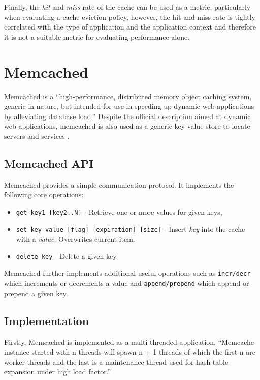 Finally, the \textit{hit} and \textit{miss} rate of the cache can be used as a metric, particularly when evaluating a cache eviction policy, however, the hit and miss rate is tightly correlated with the type of application and the application context and therefore it is not a suitable metric for evaluating performance alone.


\section{Memcached}

Memcached is a ``high-performance, distributed memory object caching system, generic in nature, but intended for use in speeding up dynamic web applications by alleviating database load.'' \cite{interactive2006memcached} Despite the official description aimed at dynamic web applications, memcached is also used as a generic key value store to locate servers and services \cite{atikoglu2012workload}.

\subsection{Memcached API}
Memcached provides a simple communication protocol. It implements the following core operations:

\begin{itemize}
    \item \texttt{get key1 [key2..N]} - Retrieve one or more values for given keys,
    \item \texttt{set key value [flag] [expiration] [size]} - Insert \textit{key} into the cache with a \textit{value}. Overwrites current item.
    \item \texttt{delete key} - Delete a given key.
\end{itemize}

Memcached further implements additional useful operations such as \texttt{incr/decr} which increments or decrements a value and \texttt{append/prepend} which append or prepend a given key.

\subsection{Implementation}
Firstly, Memcached is implemented as a multi-threaded application. ``Memcache instance started with n threads will spawn n + 1 threads of which the first n are worker threads and the last is a maintenance thread used for hash table expansion under high load factor.'' \cite{solarflarememcached}

